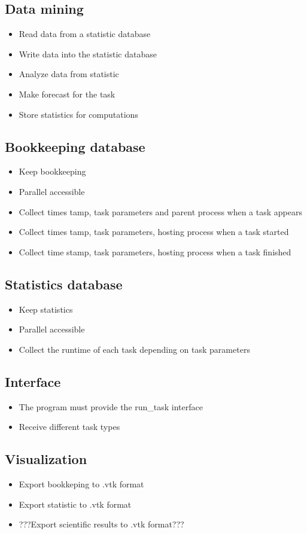 {	
	\subsection{Data mining}
	
		\begin{itemize}
			\item Read data from a statistic database
			\item Write data into the statistic database
			\item Analyze data from statistic
			\item Make forecast for the task
			\item Store statistics for computations
		\end{itemize}
	
	
	\subsection{Bookkeeping database}
	
		\begin{itemize}
			\item Keep bookkeeping
			\item Parallel accessible
			\item Collect times tamp, task parameters and parent process when a task appears
			\item Collect times tamp, task parameters, hosting process when a task started
			\item Collect time stamp, task parameters, hosting process when a task finished
		\end{itemize}
	
	
	\subsection{Statistics database}
	
		\begin{itemize}
			\item Keep statistics
			\item Parallel accessible
			\item Collect the runtime of each task depending on task parameters
		\end{itemize}
	
	
	\subsection{Interface}
	
		\begin{itemize}
			\item The program must provide the run\_task interface
			\item Receive different task types
		\end{itemize}
		
		
	\subsection{Visualization}
	
		\begin{itemize}
			\item Export bookkeping to .vtk format
			\item Export statistic to .vtk format
			\item ???Export scientific results to .vtk format??? 
		\end{itemize}

}